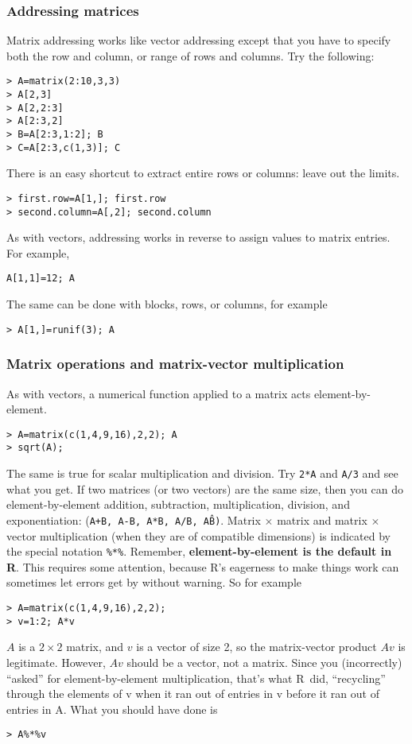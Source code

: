 \documentclass [11pt]{article}
\newcommand{\code}[1]{{\tt #1}}
\newcommand\R{{\sf R}}
\numberwithin{exercise}{section}
\begin{document}
\subsubsection{Addressing matrices}
Matrix addressing works like vector addressing except that you have 
to specify both the row and column, or range of rows and columns. 
Try the following:
\begin{verbatim}
> A=matrix(2:10,3,3) 
> A[2,3]
> A[2,2:3] 
> A[2:3,2] 
> B=A[2:3,1:2]; B
> C=A[2:3,c(1,3)]; C
\end{verbatim} 
There is an easy shortcut to extract entire rows or columns: leave out the limits. 
\begin{verbatim}
> first.row=A[1,]; first.row
> second.column=A[,2]; second.column
\end{verbatim}
As with vectors, addressing works in reverse to assign values to matrix 
entries. For example,
\begin{verbatim}
A[1,1]=12; A
\end{verbatim}
The same can be done with blocks, rows, or columns, for example
\begin{verbatim}
> A[1,]=runif(3); A
\end{verbatim}


\subsubsection{Matrix operations and matrix-vector multiplication} 
As with vectors, a numerical function applied to a matrix acts element-by-element. 
\begin{verbatim}
> A=matrix(c(1,4,9,16),2,2); A
> sqrt(A);
\end{verbatim}
The same is true for scalar multiplication and division. Try \code{2*A} and \code{A/3} and see what you get.
If two matrices (or two vectors) are the same size, then you can do element-by-element 
addition, subtraction, multiplication, division, and exponentiation:  
(\code{A+B, A-B, A*B, A/B, A\^B)}. Matrix $\times$ matrix and matrix $\times$ vector 
multiplication (when they are of compatible dimensions) is indicated by the special notation 
\code{\%*\%}. Remember, \textbf{element-by-element is the default in R}. This requires
some attention, because \R's eagerness to make things work can sometimes let errors get
by without warning. So for example
\begin{verbatim}
> A=matrix(c(1,4,9,16),2,2);
> v=1:2; A*v
\end{verbatim}
$A$ is a $2 \times 2$ matrix, and $v$ is a vector of size 2,
so the matrix-vector product $Av$ is legitimate. However, $Av$ should be a vector,
not a matrix. Since you (incorrectly) ``asked'' for element-by-element multiplication,
that's what \R\ did, ``recycling'' through the elements of v when it ran out of entries
in v before it ran out of entries in A. What you should have done is
\vspace{-0.1in}
\begin{verbatim}
> A%*%v
\end{verbatim}
\vspace{-0.1in}
\end{document}
